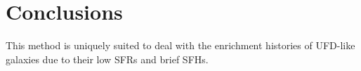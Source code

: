 \section {Conclusions}
\label{conc}

This method is uniquely suited to deal with the enrichment histories of UFD-like galaxies due to their low SFRs and brief SFHs. 
